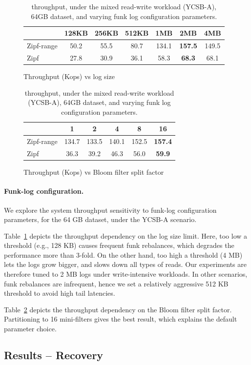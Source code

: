 \begin{table}
\centering
\begin{subfigure}{0.55\linewidth}
{\small{
\begin{tabular}{|l|c|c|c|c|c|c|}
\hline 
& 128KB & 256KB & 512KB & 1MB & 2MB & 4MB\\
\hline 
Zipf-range & 50.2	& 55.5 & 80.7	& 134.1 & {\bf {157.5}} & 149.5 \\
Zipf & 27.8	& 30.9 & 36.1	& 58.3	& {\bf {68.3}}	& 68.1 \\
\hline
\end{tabular}
}}
\caption{Throughput (Kops) vs log size}
\label{fig:wal:sz}
\end{subfigure}
\begin{subfigure}{0.35\linewidth}
{\small{
\begin{tabular}{|l|c|c|c|c|c|}
\hline 
& 1 & 2 & 4 & 8 & 16\\
\hline 
Zipf-range & 134.7 & 133.5 & 140.1 & 152.5 & {\bf {157.4}} \\
Zipf & 36.3 & 39.2 & 46.3 & 56.0 & {\bf {59.9}} \\
\hline 
\end{tabular}
}}
\caption{Throughput (Kops) vs Bloom filter split factor}
\label{fig:wal:bf}
\end{subfigure}
\caption{{\sys\/ throughput, under the mixed read-write workload (YCSB-A), 64GB dataset, and varying funk log configuration parameters.}}
\label{fig:wal}
\end{table}
\paragraph{Funk-log configuration.} 
We explore the system throughput sensitivity to funk-log configuration parameters, for the 64 GB dataset, 
under the YCSB-A scenario. 

Table~\ref{fig:wal:sz} depicts the throughput dependency on the log size limit. Here, too low a threshold (e.g., 128 KB) 
causes frequent funk rebalances, which degrades the performance more than 3-fold. On the other hand, too high a threshold (4 MB) 
lets the logs grow bigger, and slows down all types of reads. Our experiments are therefore tuned to 2 MB logs under write-intensive 
workloads. In other scenarios, funk rebalances are infrequent, hence we set a relatively aggressive 512 KB threshold to avoid high tail
latencies. 

Table~\ref{fig:wal:bf} depicts the throughput dependency on the Bloom filter split factor. 
Partitioning to 16 mini-filters gives the best result, which explains the default parameter choice. 

\subsection{Results -- Recovery}